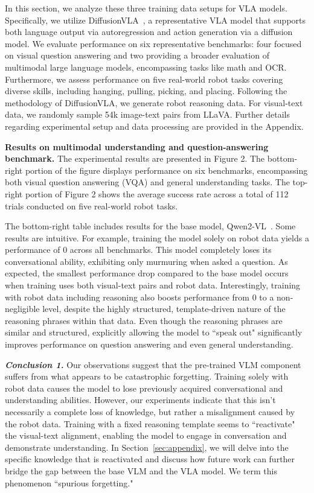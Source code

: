 In this section, we analyze these three training data setups for VLA models. Specifically, we utilize DiffusionVLA~\cite{diffusionvla}, a representative VLA model that supports both language output via autoregression and action generation via a diffusion model. We evaluate performance on six representative benchmarks: four focused on visual question answering and two providing a broader evaluation of multimodal large language models, encompassing tasks like math and OCR.  Furthermore, we assess performance on five real-world robot tasks covering diverse skills, including hanging, pulling, picking, and placing.  Following the methodology of DiffusionVLA, we generate robot reasoning data. For visual-text data, we randomly sample 54k image-text pairs from LLaVA. Further details regarding experimental setup and data processing are provided in the Appendix.


\textbf{Results on multimodal understanding and question-answering benchmark.} The experimental results are presented in Figure 2. The bottom-right portion of the figure displays performance on six benchmarks, encompassing both visual question answering (VQA) and general understanding tasks. The top-right portion of Figure 2 shows the average success rate across a total of 112 trials conducted on five real-world robot tasks. 

The bottom-right table includes results for the base model, Qwen2-VL~\cite{wang2024qwen2}. Some results are intuitive. For example, training the model solely on robot data yields a performance of 0 across all benchmarks. This model completely loses its conversational ability, exhibiting only murmuring when asked a question. As expected, the smallest performance drop compared to the base model occurs when training uses both visual-text pairs and robot data. Interestingly, training with robot data including reasoning also boosts performance from 0 to a non-negligible level, despite the highly structured, template-driven nature of the reasoning phrases within that data. Even though the reasoning phrases are similar and structured, explicitly allowing the model to ``speak out" significantly improves performance on question answering and even general understanding.

\textbf{\textit{Conclusion 1.}} Our observations suggest that the pre-trained VLM component suffers from what appears to be catastrophic forgetting. Training solely with robot data causes the model to lose previously acquired conversational and understanding abilities. However, our experiments indicate that this isn't necessarily a complete loss of knowledge, but rather a misalignment caused by the robot data. Training with a fixed reasoning template seems to ``reactivate" the visual-text alignment, enabling the model to engage in conversation and demonstrate understanding. In Section~\ref{sec:appendix}, we will delve into the specific knowledge that is reactivated and discuss how future work can further bridge the gap between the base VLM and the VLA model. We term this phenomenon ``spurious forgetting."



